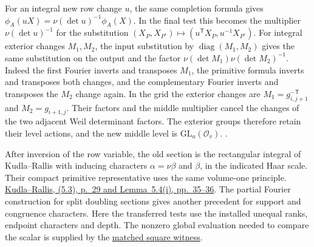 For an integral new row change \(u\), the same completion formula gives
\(\phi_A(uX)=\nu(\det u)^{-1}\phi_A(X)\). In the final test this becomes
the multiplier \(\nu(\det u)^{-1}\) for the substitution
\((X_P,X_{P^c})\mapsto(u^{\mathsf T}X_P,u^{-1}X_{P^c})\).
For integral exterior changes \(M_1,M_2\), the input substitution by
\(\operatorname{diag}(M_1,M_2)\) gives the same substitution on the
output and the factor \(\nu(\det M_1)\nu(\det M_2)^{-1}\).
Indeed the first Fourier inverts and transposes \(M_1\), the primitive
formula inverts and transposes both changes, and the complementary
Fourier inverts and transposes the \(M_2\) change again. In the grid
the exterior changes are \(M_1=g_{i,j+1}^{-\mathsf T}\) and
\(M_2=g_{i+1,j}\). Their factors and the middle multiplier cancel
the changes of the two adjacent Weil determinant factors.
The exterior groups therefore retain their level actions, and the new
middle level is \(\mathrm{GL}_a(\mathcal O_v)\).
.

After inversion of the row variable, the old section is the rectangular
integral of Kudla--Rallis with inducing characters \(\alpha=\nu\beta\)
and \(\beta\), in the indicated Haar scale. Their compact primitive
representative uses the same volume-one principle.
\href{https://doi.org/10.1515/crll.1988.387.1}{Kudla--Rallis, (5.3), p.~29 and Lemma~5.4(i), pp.~35--36}.
The partial Fourier construction for split doubling sections gives another
precedent for support and congruence characters.
\cite[\S4.3.1, (55)--(58) and Lemma~4.3.2]{p2eischen-doubling}
Here the transferred tests use the installed unequal ranks, endpoint
characters and depth. The nonzero global evaluation needed to compare
the scalar is supplied by the \hyperlink{proof.period-square-witness}{matched square witness}.

